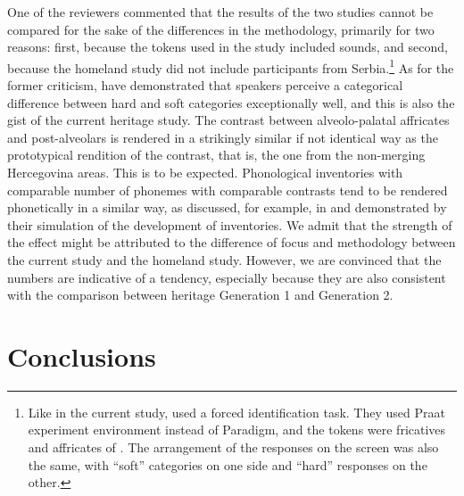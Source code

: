 \documentclass[output=paper,modfonts,newtxmath,hidelinks,]{langscibook}
\begin{document}
  
One of the reviewers commented that the results of the two studies cannot be compared for the sake of the differences in the methodology, primarily for two reasons: first, because the tokens used in the \citet{Cavar-Hamann2011} study included  sounds, and second, because the homeland study did not include participants from Serbia.\footnote{Like in the current study, \citeauthor{Cavar-Hamann2011} used a forced identification task. They used Praat experiment environment instead of Paradigm, and the tokens were fricatives and affricates of  \citep{Boersma-Weenink_praat}. The arrangement of the responses on the screen was also the same, with “soft”  categories on one side and “hard”  responses on the other.} As for the former criticism, \citet{Cavar-Hamann2011} have demonstrated that  speakers perceive a categorical difference between hard and soft categories exceptionally well, and this is also the gist of the current heritage study. The  contrast between alveolo-palatal affricates and post-alveolars is rendered in a strikingly similar if not identical way as the prototypical rendition of the  contrast, that is, the one from the non-merging Hercegovina areas. This is to be expected. Phonological inventories with comparable number of phonemes with comparable contrasts tend to be rendered phonetically in a similar way, as discussed, for example, in \citet{Boersma-Hamann2008} and demonstrated by their simulation of the development of  inventories. We admit that the strength of the effect might be attributed to the difference of focus and methodology between the current study and the homeland study. However, we are convinced that the numbers are indicative of a tendency, especially because they are also consistent with the comparison between heritage Generation 1 and Generation 2.


\section{Conclusions}\label{sec:mihajlovic:7}
\end{document}

